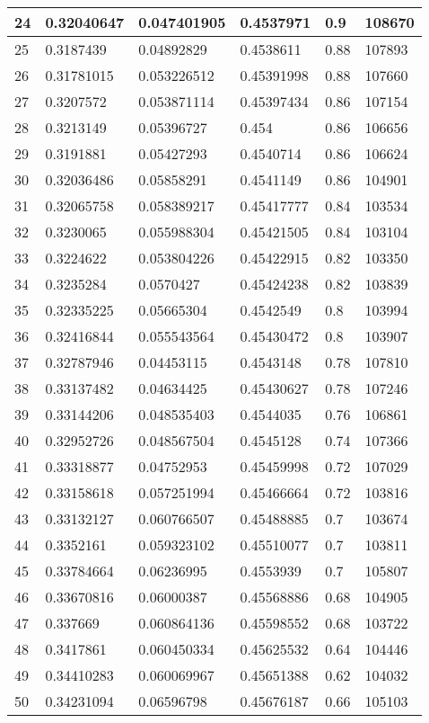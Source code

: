 \begin{longtable}{|l|l|l|l|l|l|}
24 & 0.32040647 & 0.047401905 & 0.4537971 & 0.9 & 108670 \\ \hline 
25 & 0.3187439 & 0.04892829 & 0.4538611 & 0.88 & 107893 \\ \hline 
26 & 0.31781015 & 0.053226512 & 0.45391998 & 0.88 & 107660 \\ \hline 
27 & 0.3207572 & 0.053871114 & 0.45397434 & 0.86 & 107154 \\ \hline 
28 & 0.3213149 & 0.05396727 & 0.454 & 0.86 & 106656 \\ \hline 
29 & 0.3191881 & 0.05427293 & 0.4540714 & 0.86 & 106624 \\ \hline 
30 & 0.32036486 & 0.05858291 & 0.4541149 & 0.86 & 104901 \\ \hline 
31 & 0.32065758 & 0.058389217 & 0.45417777 & 0.84 & 103534 \\ \hline 
32 & 0.3230065 & 0.055988304 & 0.45421505 & 0.84 & 103104 \\ \hline 
33 & 0.3224622 & 0.053804226 & 0.45422915 & 0.82 & 103350 \\ \hline 
34 & 0.3235284 & 0.0570427 & 0.45424238 & 0.82 & 103839 \\ \hline 
35 & 0.32335225 & 0.05665304 & 0.4542549 & 0.8 & 103994 \\ \hline 
36 & 0.32416844 & 0.055543564 & 0.45430472 & 0.8 & 103907 \\ \hline 
37 & 0.32787946 & 0.04453115 & 0.4543148 & 0.78 & 107810 \\ \hline 
38 & 0.33137482 & 0.04634425 & 0.45430627 & 0.78 & 107246 \\ \hline 
39 & 0.33144206 & 0.048535403 & 0.4544035 & 0.76 & 106861 \\ \hline 
40 & 0.32952726 & 0.048567504 & 0.4545128 & 0.74 & 107366 \\ \hline 
41 & 0.33318877 & 0.04752953 & 0.45459998 & 0.72 & 107029 \\ \hline 
42 & 0.33158618 & 0.057251994 & 0.45466664 & 0.72 & 103816 \\ \hline 
43 & 0.33132127 & 0.060766507 & 0.45488885 & 0.7 & 103674 \\ \hline 
44 & 0.3352161 & 0.059323102 & 0.45510077 & 0.7 & 103811 \\ \hline 
45 & 0.33784664 & 0.06236995 & 0.4553939 & 0.7 & 105807 \\ \hline 
46 & 0.33670816 & 0.06000387 & 0.45568886 & 0.68 & 104905 \\ \hline 
47 & 0.337669 & 0.060864136 & 0.45598552 & 0.68 & 103722 \\ \hline 
48 & 0.3417861 & 0.060450334 & 0.45625532 & 0.64 & 104446 \\ \hline 
49 & 0.34410283 & 0.060069967 & 0.45651388 & 0.62 & 104032 \\ \hline 
50 & 0.34231094 & 0.06596798 & 0.45676187 & 0.66 & 105103 \\ \hline 
\end{longtable}